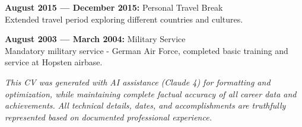\documentclass[10pt,a4paper]{article}
\begin{document}
\textbf{August 2015 --- December 2015:} Personal Travel Break \\
Extended travel period exploring different countries and cultures.

\textbf{August 2003 --- March 2004:} Military Service \\
Mandatory military service - German Air Force, completed basic training and service at Hopsten airbase.

\vfill

\begin{center}
\footnotesize
\textit{This CV was generated with AI assistance (Claude 4) for formatting and optimization, while maintaining complete factual accuracy of all career data and achievements. All technical details, dates, and accomplishments are truthfully represented based on documented professional experience.}
\end{center}
\end{document}
